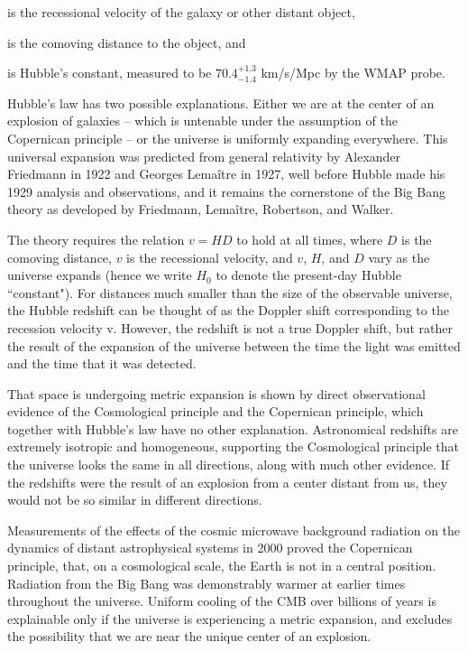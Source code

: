 \documentclass[14pt, oneside]{book}
\begin{document}
		\begin{description}[align=right]
			\item[$v$] is the recessional velocity of the galaxy or other distant object,
			\item[$D$] is the comoving distance to the object, and
			\item[$H_{0}$] is Hubble's constant, measured to be $70.4^{+1.3}_{-1.4}$ km/s/Mpc by the WMAP probe.
		\end{description}
		
		Hubble's law has two possible explanations. Either we are at the center of an explosion of galaxies -- which is untenable under the assumption of the Copernican principle -- or the universe is uniformly expanding everywhere. This universal expansion was predicted from general relativity by Alexander Friedmann in 1922 and Georges Lemaître in 1927, well before Hubble made his 1929 analysis and observations, and it remains the cornerstone of the Big Bang theory as developed by Friedmann, Lemaître, Robertson, and Walker.
		
		The theory requires the relation $v=HD$ to hold at all times, where $D$ is the comoving distance, $v$ is the recessional velocity, and $v$, $H$, and $D$ vary as the universe expands (hence we write $H_{0}$ to denote the present-day Hubble ``constant"). For distances much smaller than the size of the observable universe, the Hubble redshift can be thought of as the Doppler shift corresponding to the recession velocity v. However, the redshift is not a true Doppler shift, but rather the result of the expansion of the universe between the time the light was emitted and the time that it was detected.
		
		That space is undergoing metric expansion is shown by direct observational evidence of the Cosmological principle and the Copernican principle, which together with Hubble's law have no other explanation. Astronomical redshifts are extremely isotropic and homogeneous, supporting the Cosmological principle that the universe looks the same in all directions, along with much other evidence. If the redshifts were the result of an explosion from a center distant from us, they would not be so similar in different directions.
		
		Measurements of the effects of the cosmic microwave background radiation on the dynamics of distant astrophysical systems in 2000 proved the Copernican principle, that, on a cosmological scale, the Earth is not in a central position. Radiation from the Big Bang was demonstrably warmer at earlier times throughout the universe. Uniform cooling of the CMB over billions of years is explainable only if the universe is experiencing a metric expansion, and excludes the possibility that we are near the unique center of an explosion.
\end{document}

